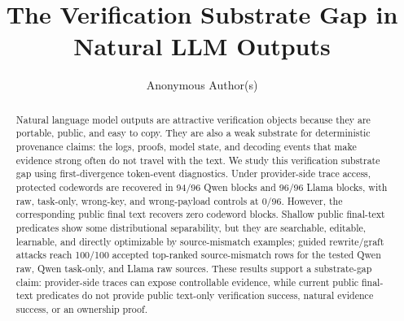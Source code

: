 \documentclass{article}
\title{The Verification Substrate Gap in Natural LLM Outputs}
\author{Anonymous Author(s)}
\theoremstyle{definition}
\theoremstyle{plain}
\begin{document}
\maketitle

\begin{abstract}
Natural language model outputs are attractive verification objects because they
are portable, public, and easy to copy.  They are also a weak substrate for
deterministic provenance claims: the logs, proofs, model state, and decoding
events that make evidence strong often do not travel with the text.  We study
this verification substrate gap using first-divergence token-event diagnostics.
Under provider-side trace access, protected codewords are recovered in
94/96 Qwen blocks and 96/96 Llama blocks, with raw, task-only, wrong-key, and
wrong-payload controls at 0/96.  However, the corresponding public final text
recovers zero codeword blocks.  Shallow public final-text predicates show some
distributional separability, but they are searchable, editable, learnable, and
directly optimizable by source-mismatch examples; guided rewrite/graft attacks
reach 100/100 accepted top-ranked source-mismatch rows for the tested Qwen raw,
Qwen task-only, and Llama raw sources.  These results support a substrate-gap
claim: provider-side traces can expose controllable evidence, while current
public final-text predicates do not provide public text-only verification
success, natural evidence success, or an ownership proof.
\end{abstract}














\appendix








\newpage

\end{document}
